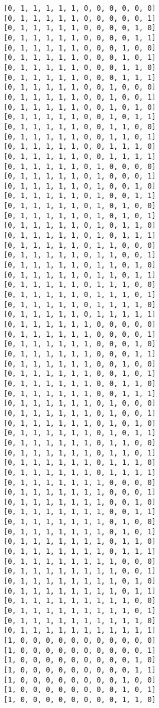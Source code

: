 \documentclass[11pt]{article}
\begin{document}
\begin{Verbatim}[commandchars=\\\{\}]
[0, 1, 1, 1, 1, 1, 0, 0, 0, 0, 0, 0]
[0, 1, 1, 1, 1, 1, 0, 0, 0, 0, 0, 1]
[0, 1, 1, 1, 1, 1, 0, 0, 0, 0, 1, 0]
[0, 1, 1, 1, 1, 1, 0, 0, 0, 0, 1, 1]
[0, 1, 1, 1, 1, 1, 0, 0, 0, 1, 0, 0]
[0, 1, 1, 1, 1, 1, 0, 0, 0, 1, 0, 1]
[0, 1, 1, 1, 1, 1, 0, 0, 0, 1, 1, 0]
[0, 1, 1, 1, 1, 1, 0, 0, 0, 1, 1, 1]
[0, 1, 1, 1, 1, 1, 0, 0, 1, 0, 0, 0]
[0, 1, 1, 1, 1, 1, 0, 0, 1, 0, 0, 1]
[0, 1, 1, 1, 1, 1, 0, 0, 1, 0, 1, 0]
[0, 1, 1, 1, 1, 1, 0, 0, 1, 0, 1, 1]
[0, 1, 1, 1, 1, 1, 0, 0, 1, 1, 0, 0]
[0, 1, 1, 1, 1, 1, 0, 0, 1, 1, 0, 1]
[0, 1, 1, 1, 1, 1, 0, 0, 1, 1, 1, 0]
[0, 1, 1, 1, 1, 1, 0, 0, 1, 1, 1, 1]
[0, 1, 1, 1, 1, 1, 0, 1, 0, 0, 0, 0]
[0, 1, 1, 1, 1, 1, 0, 1, 0, 0, 0, 1]
[0, 1, 1, 1, 1, 1, 0, 1, 0, 0, 1, 0]
[0, 1, 1, 1, 1, 1, 0, 1, 0, 0, 1, 1]
[0, 1, 1, 1, 1, 1, 0, 1, 0, 1, 0, 0]
[0, 1, 1, 1, 1, 1, 0, 1, 0, 1, 0, 1]
[0, 1, 1, 1, 1, 1, 0, 1, 0, 1, 1, 0]
[0, 1, 1, 1, 1, 1, 0, 1, 0, 1, 1, 1]
[0, 1, 1, 1, 1, 1, 0, 1, 1, 0, 0, 0]
[0, 1, 1, 1, 1, 1, 0, 1, 1, 0, 0, 1]
[0, 1, 1, 1, 1, 1, 0, 1, 1, 0, 1, 0]
[0, 1, 1, 1, 1, 1, 0, 1, 1, 0, 1, 1]
[0, 1, 1, 1, 1, 1, 0, 1, 1, 1, 0, 0]
[0, 1, 1, 1, 1, 1, 0, 1, 1, 1, 0, 1]
[0, 1, 1, 1, 1, 1, 0, 1, 1, 1, 1, 0]
[0, 1, 1, 1, 1, 1, 0, 1, 1, 1, 1, 1]
[0, 1, 1, 1, 1, 1, 1, 0, 0, 0, 0, 0]
[0, 1, 1, 1, 1, 1, 1, 0, 0, 0, 0, 1]
[0, 1, 1, 1, 1, 1, 1, 0, 0, 0, 1, 0]
[0, 1, 1, 1, 1, 1, 1, 0, 0, 0, 1, 1]
[0, 1, 1, 1, 1, 1, 1, 0, 0, 1, 0, 0]
[0, 1, 1, 1, 1, 1, 1, 0, 0, 1, 0, 1]
[0, 1, 1, 1, 1, 1, 1, 0, 0, 1, 1, 0]
[0, 1, 1, 1, 1, 1, 1, 0, 0, 1, 1, 1]
[0, 1, 1, 1, 1, 1, 1, 0, 1, 0, 0, 0]
[0, 1, 1, 1, 1, 1, 1, 0, 1, 0, 0, 1]
[0, 1, 1, 1, 1, 1, 1, 0, 1, 0, 1, 0]
[0, 1, 1, 1, 1, 1, 1, 0, 1, 0, 1, 1]
[0, 1, 1, 1, 1, 1, 1, 0, 1, 1, 0, 0]
[0, 1, 1, 1, 1, 1, 1, 0, 1, 1, 0, 1]
[0, 1, 1, 1, 1, 1, 1, 0, 1, 1, 1, 0]
[0, 1, 1, 1, 1, 1, 1, 0, 1, 1, 1, 1]
[0, 1, 1, 1, 1, 1, 1, 1, 0, 0, 0, 0]
[0, 1, 1, 1, 1, 1, 1, 1, 0, 0, 0, 1]
[0, 1, 1, 1, 1, 1, 1, 1, 0, 0, 1, 0]
[0, 1, 1, 1, 1, 1, 1, 1, 0, 0, 1, 1]
[0, 1, 1, 1, 1, 1, 1, 1, 0, 1, 0, 0]
[0, 1, 1, 1, 1, 1, 1, 1, 0, 1, 0, 1]
[0, 1, 1, 1, 1, 1, 1, 1, 0, 1, 1, 0]
[0, 1, 1, 1, 1, 1, 1, 1, 0, 1, 1, 1]
[0, 1, 1, 1, 1, 1, 1, 1, 1, 0, 0, 0]
[0, 1, 1, 1, 1, 1, 1, 1, 1, 0, 0, 1]
[0, 1, 1, 1, 1, 1, 1, 1, 1, 0, 1, 0]
[0, 1, 1, 1, 1, 1, 1, 1, 1, 0, 1, 1]
[0, 1, 1, 1, 1, 1, 1, 1, 1, 1, 0, 0]
[0, 1, 1, 1, 1, 1, 1, 1, 1, 1, 0, 1]
[0, 1, 1, 1, 1, 1, 1, 1, 1, 1, 1, 0]
[0, 1, 1, 1, 1, 1, 1, 1, 1, 1, 1, 1]
[1, 0, 0, 0, 0, 0, 0, 0, 0, 0, 0, 0]
[1, 0, 0, 0, 0, 0, 0, 0, 0, 0, 0, 1]
[1, 0, 0, 0, 0, 0, 0, 0, 0, 0, 1, 0]
[1, 0, 0, 0, 0, 0, 0, 0, 0, 0, 1, 1]
[1, 0, 0, 0, 0, 0, 0, 0, 0, 1, 0, 0]
[1, 0, 0, 0, 0, 0, 0, 0, 0, 1, 0, 1]
[1, 0, 0, 0, 0, 0, 0, 0, 0, 1, 1, 0]

\end{Verbatim}
\end{document}
